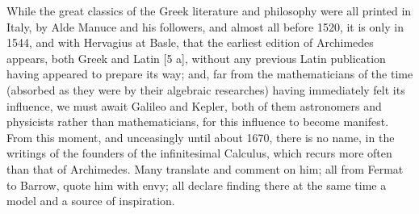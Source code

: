 While the great classics of the Greek literature and philosophy were all printed in Italy, by Alde Manuce and his followers, and almost all before 1520, it is only in 1544, and with Hervagius at Basle, that the earliest edition of Archimedes appears, both Greek and Latin {[}5 a{]}, without any previous Latin publication having appeared to prepare its way; and, far from the mathematicians of the time (absorbed as they were by their algebraic researches) having immediately felt its influence, we must await Galileo and Kepler, both of them astronomers and physicists rather than mathematicians, for this influence to become manifest. From this moment, and unceasingly until about 1670, there is no name, in the writings of the founders of the infinitesimal Calculus, which recurs more often than that of Archimedes. Many translate and comment on him; all from Fermat to Barrow, quote him with envy; all declare finding there at the same time a model and a source of inspiration.

